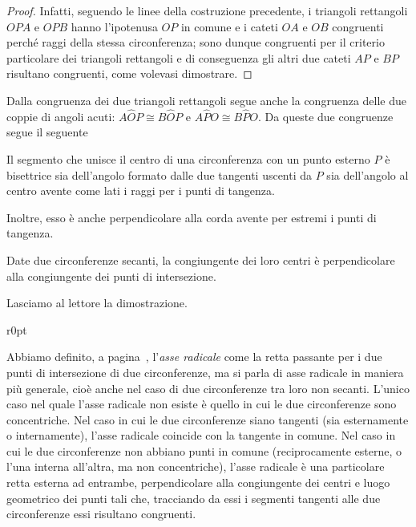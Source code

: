\begin{proof}
Infatti, seguendo le linee della costruzione precedente, i triangoli 
rettangoli \(OPA\) e \(OPB\) hanno l'ipotenusa \(OP\) in comune e i cateti 
\(OA\) e \(OB\) congruenti perché raggi della stessa circonferenza; sono 
dunque congruenti per il criterio particolare dei triangoli 
rettangoli e di conseguenza gli altri due cateti \(AP\) e \(BP\) 
risultano congruenti, come volevasi dimostrare.
\end{proof}

Dalla congruenza dei due triangoli rettangoli segue anche la 
congruenza delle due coppie di angoli acuti: \(A\widehat{O}P\cong 
B\widehat{O}P\) e \(A\widehat{P}O\cong B\widehat{P}O\). Da queste due 
congruenze segue il seguente 
\begin{corollario}\label{cor:5.1}
Il segmento che unisce il centro di una circonferenza con un punto 
esterno \(P\) è bisettrice sia dell'angolo formato dalle due tangenti 
uscenti da \(P\) sia dell'angolo al centro avente come lati i raggi per 
i punti di tangenza.
\end{corollario}
Inoltre, esso è anche perpendicolare alla corda avente per estremi i 
punti di tangenza.

\begin{corollario}
Date due circonferenze secanti, la congiungente dei loro centri è 
perpendicolare alla congiungente dei punti di intersezione.
\end{corollario}

Lasciamo al lettore la dimostrazione.

\begin{wrapfigure}{r}{0pt}
	\centering
\end{wrapfigure}
Abbiamo definito, a pagina~\pageref{def:asse_radicale}, l'\emph{asse 
radicale} come la retta passante per i due punti di intersezione di 
due circonferenze, ma si parla di asse radicale in maniera più 
generale, cioè anche nel caso di due circonferenze tra loro non 
secanti. L'unico caso nel quale l'asse radicale non esiste è quello 
in cui le due circonferenze sono concentriche.
Nel caso in cui le due circonferenze siano tangenti (sia esternamente 
o internamente), l'asse radicale coincide con la tangente in comune.
Nel caso in cui le due circonferenze non abbiano punti in comune 
(reciprocamente esterne, o l'una interna all'altra, ma non 
concentriche), l'asse radicale è una particolare retta esterna ad 
entrambe, perpendicolare alla congiungente dei centri e luogo 
geometrico dei punti tali che, tracciando da essi i segmenti tangenti 
alle due circonferenze essi risultano congruenti.


